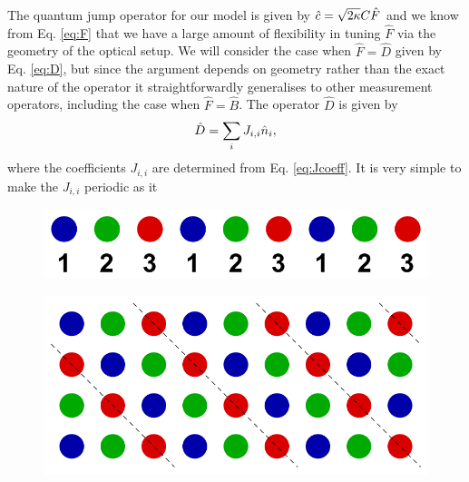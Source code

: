 The quantum jump operator for our model is given by
$\hat{c} = \sqrt{2 \kappa} C \hat{F}$ and we know from Eq. \eqref{eq:F}
that we have a large amount of flexibility in tuning $\hat{F}$ via the
geometry of the optical setup. We will consider the case when
$\hat{F} = \hat{D}$ given by Eq. \eqref{eq:D}, but since the argument
depends on geometry rather than the exact nature of the operator it
straightforwardly generalises to other measurement operators,
including the case when $\hat{F} = \hat{B}$. The operator $\hat{D}$ is
given by 
\begin{equation}
  \hat{D} = \sum_i J_{i,i} \hat{n}_i,
\end{equation}
where the coefficients $J_{i,i}$ are determined from
Eq. \eqref{eq:Jcoeff}. It is very simple to make the $J_{i,i}$
periodic as it 

\begin{figure}[htbp!]
  \centering
  \includegraphics[width=1.0\textwidth]{1DModes}
  \caption[1D Modes due to Measurement Backaction]{}
  \label{fig:cavity}
\end{figure}

\begin{figure}[htbp!]
  \centering
  \includegraphics[width=1.0\textwidth]{2DModes}
  \caption[2D Modes due to Measurement Backaction]{}
  \label{fig:cavity}
\end{figure}
